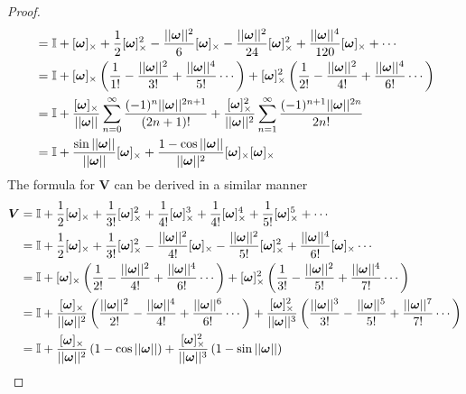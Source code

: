 \begin{proof}
\begin{subequations}
\begin{align*}
       &= \mathbb{I} + [\bm{\omega}]_{\times} + \frac{1}{2}[\bm{\omega}]_{\times}^2 -\frac{||\bm{\omega}||^2}{6}[\bm{\omega}]_{\times} - \frac{||\bm{\omega}||^2}{24}[\bm{\omega}]_{\times}^2 + \frac{||\bm{\omega}||^4}{120}[\bm{\omega}]_{\times} + \cdots \\
       &= \mathbb{I} + [\bm{\omega}]_{\times}\left(\frac{1}{1!} - \frac{||\bm{\omega}||^2}{3!} + \frac{||\bm{\omega}||^4}{5!} \cdots\right)
       + [\bm{\omega}]_{\times}^2\left(\frac{1}{2!} - \frac{||\bm{\omega}||^2}{4!} + \frac{||\bm{\omega}||^4}{6!} \cdots\right)\\
       &= \mathbb{I} + \frac{[\bm{\omega}]_{\times}}{||\bm{\omega}||}\sum_{n=0}^{\infty}\frac{(-1)^{n}||\bm{\omega}||^{2n+1}}{(2n+1)!}
       + \frac{[\bm{\omega}]_{\times}^2}{||\bm{\omega}||^2}\sum_{n=1}^{\infty}\frac{(-1)^{n+1}||\bm{\omega}||^{2n}}{2n!} \\
    &= \mathbb{I}
    + \frac{\sin{||\bm{\omega}||}}{||\bm{\omega}||}[\bm{\omega}]_{\times}
    + \frac{1-\cos{||\bm{\omega}||}}{||\bm{\omega}||^2}
       [\bm{\omega}]_{\times}[\bm{\omega}]_{\times}
\end{align*}
\end{subequations} 
The formula for \(\bm{V}\) can be derived in a similar manner
\begin{subequations}
\begin{align*}
\bm{V} &= \mathbb{I} + \frac{1}{2}[ \bm{\omega} ]_{\times}+ \frac{1}{3!}[ \bm{\omega} ]_{\times}^2 + \frac{1}{4!}[ \bm{\omega} ]_{\times}^3 + \frac{1}{4!}[ \bm{\omega} ]_{\times}^4 + \frac{1}{5!}[ \bm{\omega} ]_{\times}^5 + \cdots \\
    &= \mathbb{I} + \frac{1}{2}[ \bm{\omega} ]_{\times}+ \frac{1}{3!}[ \bm{\omega} ]_{\times}^2 - \frac{||\bm{\omega}||^2}{4!}[ \bm{\omega} ]_{\times} - \frac{||\bm{\omega}||^2}{5!}[ \bm{\omega} ]_{\times}^2 + \frac{||\bm{\omega}||^4}{6!}[ \bm{\omega} ]_{\times} \cdots \\
    &= \mathbb{I} + [ \bm{\omega} ]_{\times}\left(\frac{1}{2!} - \frac{||\bm{\omega}||^2}{4!} + \frac{||\bm{\omega}||^4}{6!} \cdots\right)
+ [ \bm{\omega} ]_{\times}^2\left(\frac{1}{3!} - \frac{||\bm{\omega}||^2}{5!} + \frac{||\bm{\omega}||^4}{7!}\cdots\right)\\
    &= \mathbb{I} + \frac{[ \bm{\omega} ]_{\times}}{||\bm{\omega}||^2}\left(\frac{||\bm{\omega}||^2}{2!} - \frac{||\bm{\omega}||^4}{4!} + \frac{||\bm{\omega}||^6}{6!} \cdots\right)
+ \frac{[ \bm{\omega} ]_{\times}^2}{||\bm{\omega}||^3}\left(\frac{||\bm{\omega}||^3}{3!} - \frac{||\bm{\omega}||^5}{5!} + \frac{||\bm{\omega}||^7}{7!}\cdots\right) \\
    &= \mathbb{I} + \frac{[ \bm{\omega} ]_{\times}}{||\bm{\omega}||^2}\left(1 - \cos{||\bm{\omega}||}\right)
+ \frac{[ \bm{\omega} ]_{\times}^2}{||\bm{\omega}||^3}\left(1-\sin{||\bm{\omega}||}\right)
\end{align*}
\end{subequations}
\end{proof}

